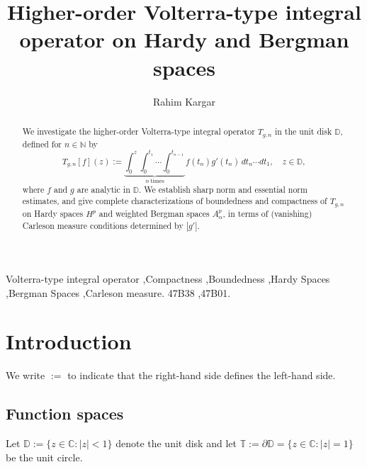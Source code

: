 \documentclass[preprint,12pt]{elsarticle}
\numberwithin{equation}{section}
\theoremstyle{remark}
\begin{document}
\begin{frontmatter}


\title{Higher-order Volterra-type integral operator on Hardy and Bergman spaces}

\author{Rahim Kargar}

\begin{abstract}

We investigate the higher-order Volterra-type integral operator $T_{g,n}$ in the unit disk $\mathbb D$,
defined for $n\in\mathbb N$ by
\begin{equation*}
T_{g,n}[f](z)
:= \underbrace{\int_{0}^{z}\int_{0}^{t_1}\cdots\int_{0}^{t_{n-1}}}_{n\ \text{times}}
f(t_n)g'(t_n)\,dt_n\cdots dt_1,\quad z\in\mathbb D,
\end{equation*}
where $f$ and $g$ are analytic in $\mathbb D$.
We establish sharp norm and essential norm estimates, and give complete characterizations of boundedness and compactness of $T_{g,n}$ on Hardy spaces $H^p$ and weighted Bergman spaces $A_\alpha^p$, in terms of (vanishing) Carleson measure conditions determined by $|g'|$.

\end{abstract}

\begin{keyword}
 Volterra-type integral operator \sep Compactness \sep Boundedness \sep Hardy Spaces \sep Bergman Spaces \sep Carleson measure.
 \MSC[2020] 47B38 \sep 47B01.
\end{keyword}
\end{frontmatter}

\section{Introduction}


We write $:=$ to indicate that the right-hand side defines the left-hand side.

\subsection{Function spaces} Let $\mathbb{D}:=\{z\in\mathbb{C}: |z|<1\}$ denote the unit disk and let
$\mathbb{T}:=\partial\mathbb{D}=\{z\in\mathbb{C}: |z|=1\}$ be the unit circle.
\end{document}
